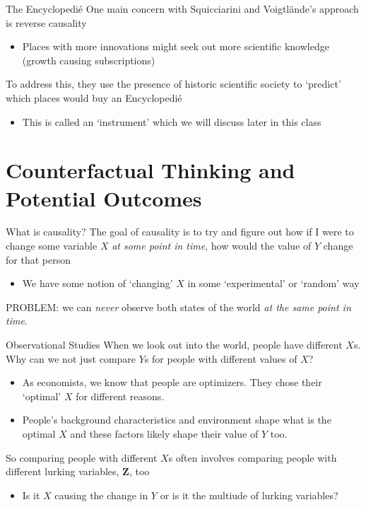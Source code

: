 \documentclass[aspectratio=169,t,11pt,table]{beamer}
\begin{document}
\begin{frame}{The Encyclopedié}
  One main concern with Squicciarini and Voigtlände's approach is reverse causality
  \begin{itemize}
    \item Places with more innovations might seek out more scientific knowledge (growth causing subscriptions)
  \end{itemize}

  \bigskip
  To address this, they use the presence of historic scientific society to `predict' which places would buy an Encyclopedié
  \begin{itemize}
    \item This is called an `instrument' which we will discuss later in this class
  \end{itemize}
\end{frame}

\section{Counterfactual Thinking and Potential Outcomes}

\begin{frame}{What is causality?}
  The goal of \alert{causality} is to try and figure out how if I were to change some variable $X$ \emph{at some point in time}, how would the value of $Y$ change for that person
  \begin{itemize}
    \item We have some notion of `changing' $X$ in some `experimental' or `random' way
  \end{itemize}

  \pause
  \bigskip
  \alert{PROBLEM:} we can \emph{never} observe both states of the world \emph{at the same point in time}.
\end{frame}

\begin{frame}{Observational Studies}
  When we look out into the world, people have different $X$s. Why can we not just compare $Y$s for people with different values of $X$? 
  
  \begin{itemize}
    \item As economists, we know that people are optimizers. They chose their `optimal' $X$ for different reasons. 
    
    \item People's background characteristics and environment shape what is the optimal $X$ and these factors likely shape their value of $Y$ too.
  \end{itemize}

  \pause
  \bigskip
  So comparing people with different $X$s often involves comparing people with different lurking variables, $\bm{Z}$, too
  \begin{itemize}
    \item Is it $X$ causing the change in $Y$ or is it the multiude of lurking variables?
  \end{itemize}
\end{frame}
\end{document}
